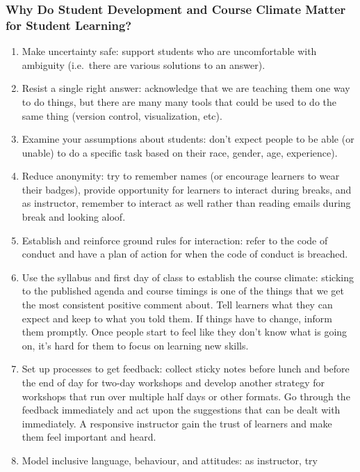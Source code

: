 \subsubsection{Why Do Student Development and Course Climate Matter for
Student
Learning?}\label{why-do-student-development-and-course-climate-matter-for-student-learning}

\begin{enumerate}
\item
  Make uncertainty safe: support students who are uncomfortable with
  ambiguity (i.e.~there are various solutions to an answer).
\item
  Resist a single right answer: acknowledge that we are teaching them
  one way to do things, but there are many many tools that could be used
  to do the same thing (version control, visualization, etc).
\item
  Examine your assumptions about students: don't expect people to be
  able (or unable) to do a specific task based on their race, gender,
  age, experience).
\item
  Reduce anonymity: try to remember names (or encourage learners to wear
  their badges), provide opportunity for learners to interact during
  breaks, and as instructor, remember to interact as well rather than
  reading emails during break and looking aloof.
\item
  Establish and reinforce ground rules for interaction: refer to the
  code of conduct and have a plan of action for when the code of conduct
  is breached.
\item
  Use the syllabus and first day of class to establish the course
  climate: sticking to the published agenda and course timings is one of
  the things that we get the most consistent positive comment about.
  Tell learners what they can expect and keep to what you told them. If
  things have to change, inform them promptly. Once people start to feel
  like they don't know what is going on, it's hard for them to focus on
  learning new skills.
\item
  Set up processes to get feedback: collect sticky notes before lunch
  and before the end of day for two-day workshops and develop another
  strategy for workshops that run over multiple half days or other
  formats. Go through the feedback immediately and act upon the
  suggestions that can be dealt with immediately. A responsive
  instructor gain the trust of learners and make them feel important and
  heard.
\item
  Model inclusive language, behaviour, and attitudes: as instructor, try

\end{enumerate}

